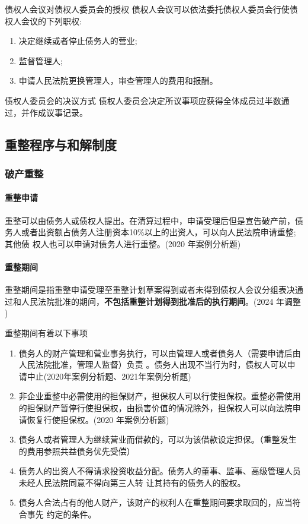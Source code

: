 \documentclass[UTF8,12pt]{ctexart}
\numberwithin{equation}{section} %
\numberwithin{figure}{section}
\numberwithin{table}{section}
\begin{document}
	债权人会议对债权人委员会的授权 债权人会议可以依法委托债权人委员会行使债权人会议的下列职权:
	\begin{enumerate}
		\item 决定继续或者停止债务人的营业;
		
		\item 监督管理人;
		
		\item 申请人民法院更换管理人，审查管理人的费用和报酬。
	\end{enumerate}

	债权人委员会的决议方式 债权人委员会决定所议事项应获得全体成员过半数通过，并作成议事记录。
	
	
	\subsection{重整程序与和解制度}
	\subsubsection{破产重整}
	\paragraph{重整申请}
	重整可以由债务人或债权人提出。在清算过程中，申请受理后但是宣告破产前，债务人或者出资额占债务人注册资本10\%以上的出资人，可以向人民法院申请重整;其他债 权人也可以申请对债务人进行重整。(2020 年案例分析题)
	
	\paragraph{重整期间}
	重整期间是指重整申请受理至重整计划草案得到或者未得到债权人会议分组表决通过和人民法院批准的期间，\textbf{不包括重整计划得到批准后的执行期间}。(2024 年调整 )
	
	重整期间有着以下事项
	\begin{enumerate}
		\item 债务人的财产管理和营业事务执行，可以由管理人或者债务人（需要申请后由人民法院批准，管理人监督）负责 。债务人出现不当行为时，债权人可以申请中止(2020年案例分析题、2021年案例分析题)
		
		\item 非企业重整中必需使用的担保财产，担保权人可以行使担保权。重整必需使用的担保财产暂停行使担保权，由损害价值的情况除外，担保权人可以向法院申请恢复行使担保权。(2020 年案例分析题)
		
		\item 债务人或者管理人为继续营业而借款的，可以为该借款设定担保。（重整发生的费用参照共益债务优先受偿）
		
		\item 债务人的出资人不得请求投资收益分配。债务人的董事、监事、高级管理人员未经人民法院同意不得向第三人转 让其持有的债务人的股权。
		
		\item 债务人合法占有的他人财产，该财产的权利人在重整期间要求取回的，应当符合事先 约定的条件。
	\end{enumerate}
	
\end{document}
